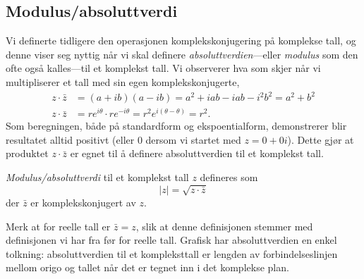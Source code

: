 \documentclass[a4paper,norsk,12pt]{article}
\begin{document}
\subsection{Modulus/absoluttverdi}
Vi definerte tidligere den operasjonen komplekskonjugering på komplekse tall, og denne viser seg nyttig når vi skal definere \emph{absoluttverdien}---eller \emph{modulus} som den ofte også kalles---til et komplekst tall. Vi observerer hva som skjer når vi multipliserer et tall med sin egen komplekskonjugerte,
\begin{align*}
	z\cdot\bar{z} &= (a + ib)(a-ib) = a^2 + iab - iab -i^2b^2 = a^2 + b^2 \\
	z\cdot\bar{z} &= re^{i\theta}\cdot re^{-i\theta} = r^2e^{i(\theta-\theta)} = r^2.
\end{align*}
Som beregningen, både på standardform og ekspoentialform, demonstrerer blir resultatet alltid positivt (eller 0 dersom vi startet med $z=0+0i$). Dette gjør at produktet $z\cdot\bar{z}$ er egnet til å definere absoluttverdien til et komplekst tall.
\begin{tdef}
\emph{Modulus/absoluttverdi} til et komplekst tall $z$ defineres som
\begin{displaymath}
	|z| = \sqrt{z\cdot\bar{z}}
\end{displaymath}
der $\bar{z}$ er komplekskonjugert av $z$.
\end{tdef}
\noindent
Merk at for reelle tall er $\bar{z}=z$, slik at denne definisjonen stemmer med definisjonen vi har fra før for reelle tall. 
Grafisk har absoluttverdien en enkel tolkning: absoluttverdien til et kompleksttall er lengden av forbindelseslinjen mellom origo og tallet når det er tegnet inn i det komplekse plan.
\end{document}
